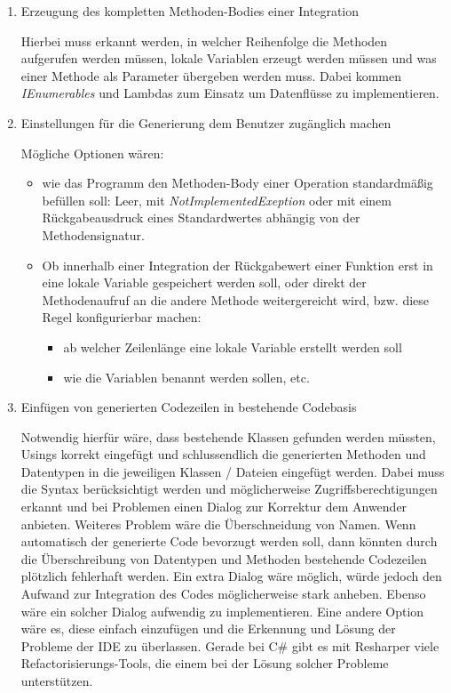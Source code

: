 \begin{enumerate}
\item Erzeugung des kompletten Methoden-Bodies einer Integration

Hierbei muss erkannt werden, in welcher Reihenfolge die Methoden aufgerufen
werden müssen, lokale Variablen erzeugt werden müssen und was einer Methode als Parameter
übergeben werden muss. Dabei kommen \textit{IEnumerables} und Lambdas zum Einsatz um
Datenflüsse zu implementieren. 

\item Einstellungen für die Generierung dem Benutzer zugänglich machen

Mögliche Optionen wären:
\begin{itemize}
\item wie das Programm den Methoden-Body einer Operation
standardmäßig befüllen soll: Leer, mit \textit{NotImplementedExeption} oder mit einem 
Rückgabeausdruck eines Standardwertes abhängig von der Methodensignatur. 

\item Ob innerhalb einer Integration der Rückgabewert einer Funktion erst in eine
lokale Variable gespeichert werden soll, oder direkt der Methodenaufruf an die
andere Methode weitergereicht wird, bzw. diese Regel konfigurierbar
machen:
\begin{itemize} 
	\item ab welcher Zeilenlänge eine lokale Variable erstellt werden soll
	\item wie die Variablen benannt werden sollen, etc.	
\end{itemize}

\end{itemize}

\item Einfügen von generierten Codezeilen in bestehende Codebasis

Notwendig hierfür wäre, dass bestehende Klassen gefunden werden müssten, Usings korrekt
eingefügt und schlussendlich die generierten Methoden und Datentypen in die
jeweiligen Klassen / Dateien eingefügt werden. Dabei muss die Syntax
berücksichtigt werden und möglicherweise Zugriffsberechtigungen erkannt und bei
Problemen einen Dialog zur Korrektur dem Anwender anbieten. Weiteres Problem
wäre die Überschneidung von Namen. Wenn automatisch der generierte Code bevorzugt
  werden soll, dann könnten durch die Überschreibung von Datentypen und Methoden
  bestehende Codezeilen plötzlich fehlerhaft werden. Ein extra Dialog wäre
  möglich, würde jedoch den Aufwand zur Integration des Codes möglicherweise stark
  anheben. Ebenso wäre ein solcher Dialog aufwendig zu implementieren.
  Eine andere Option wäre es, diese einfach einzufügen und die Erkennung und Lösung der
  Probleme der IDE zu überlassen. Gerade bei C\# gibt es mit Resharper viele
  Refactorisierungs-Tools, die einem bei der Lösung solcher Probleme unterstützen.
\end{enumerate}


